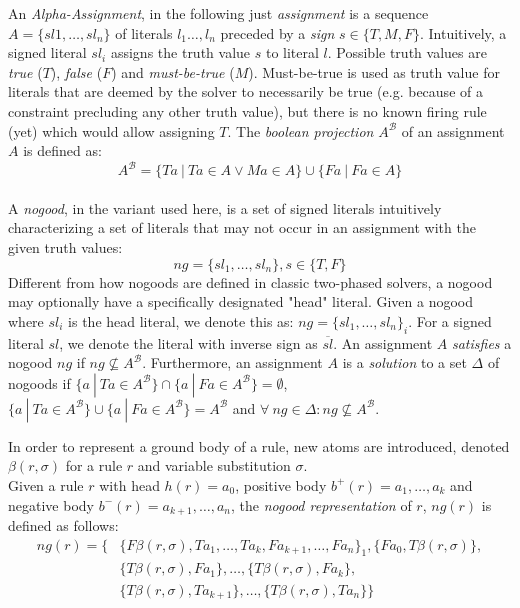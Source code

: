 \begin{definition}
\label{def:prelims-alpha-nogood}	
An \emph{Alpha-Assignment}, in the following just \emph{assignment} is a sequence $A = \{sl1,\ldots,sl_n\}$ of literals $l_1\ldots,l_n$ preceded by a \emph{sign} $s \in \{T, M, F\}$. Intuitively, a signed literal $sl_i$ assigns the truth value $s$ to literal $l$. Possible truth values are \emph{true} ($T$), \emph{false} ($F$) and \emph{must-be-true} ($M$). Must-be-true is used as truth value for literals that are deemed by the solver to necessarily be true (e.g. because of a constraint precluding any other truth value), but there is no known firing rule (yet) which would allow assigning $T$. The \emph{boolean projection} $A^{\mathcal{B}}$ of an assignment $A$ is defined as: 
\[
	A^{\mathcal{B}} = \{ Ta~|~Ta \in A \lor Ma \in A\} \cup \{ Fa~|~Fa \in A\}
\]
\\
A \emph{nogood}, in the variant used here, is a set of signed literals intuitively characterizing a set of literals that may not occur in an assignment with the given truth values:
\[
	ng = \{ sl_1,\ldots,sl_n \}, s \in \{T, F\}
\]
Different from how nogoods are defined in classic two-phased solvers, a nogood may optionally have a specifically designated "head" literal. Given a nogood where $sl_i$ is the head literal, we denote this as: $ng = \{ sl_1,\ldots,sl_n \}_i$. For a signed literal $sl$, we denote the literal with inverse sign as $\overline{sl}$.
An assignment $A$ \emph{satisfies} a nogood $ng$ if $ng \nsubseteq A^{\mathcal{B}}$. Furthermore, an assignment $A$ is a \emph{solution} to a set $\Delta$ of nogoods if $\{a~|~Ta \in A^{\mathcal{B}}\} \cap \{a~|~Fa \in A^{\mathcal{B}}\} = \emptyset$,  $\{a~|~Ta \in A^{\mathcal{B}}\} \cup \{a~|~Fa \in A^{\mathcal{B}}\} = A^{\mathcal{B}}$ and $\forall~ng \in \Delta: ng \nsubseteq A^{\mathcal{B}}$.
\end{definition}

\begin{definition}
\label{def:prelims-alpha-nogood-ruleencoding}		
In order to represent a ground body of a rule, new atoms are introduced, denoted $\beta(r,\sigma)$ for a rule $r$ and variable substitution $\sigma$.\\
Given a rule $r$ with head $h(r) = a_0$, positive body $b^{+}(r) = a_1,\ldots,a_k$ and negative body $b^{-}(r) = a_{k+1},\ldots,a_n$, the \emph{nogood representation} of $r$, $ng(r)$ is defined as follows:
\begin{align*}
	ng(r) = \{&\{F\beta(r,\sigma),Ta_1,\ldots,Ta_k,Fa_{k+1},\ldots,Fa_n\}_1,\{Fa_0,T\beta(r,\sigma)\},\\
			  &\{T\beta(r,\sigma),Fa_1\},\ldots,\{T\beta(r,\sigma),Fa_k\},\\
			  &\{T\beta(r,\sigma),Ta_{k+1}\},\ldots,\{T\beta(r,\sigma),Ta_n\}\}
\end{align*}	
\end{definition}


